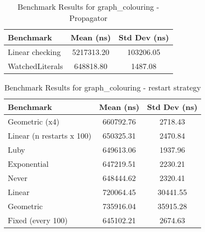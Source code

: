 \begin{table}[h]
    \centering
    \caption{Benchmark Results for graph\_colouring - Propagator}
    \begin{tabular}{|l|c|c|}
        \hline
        Benchmark & Mean (ns) & Std Dev (ns) \\
        \hline
        Linear checking & 5217313.20 & 103206.05 \\
        WatchedLiterals & 648818.80 & 1487.08 \\
        \hline
    \end{tabular}
\label{tab:bench-graph_colouring---Propagator}
\end{table}


\begin{table}[h]
    \centering
    \caption{Benchmark Results for graph\_colouring - restart strategy}
    \begin{tabular}{|l|c|c|}
        \hline
        Benchmark & Mean (ns) & Std Dev (ns) \\
        \hline
        Geometric (x4) & 660792.76 & 2718.43 \\
        Linear (n restarts x 100) & 650325.31 & 2470.84 \\
        Luby & 649613.06 & 1937.96 \\
        Exponential & 647219.51 & 2230.21 \\
        Never & 648444.62 & 2320.41 \\
        Linear & 720064.45 & 30441.55 \\
        Geometric & 735916.04 & 35915.28 \\
        Fixed (every 100) & 645102.21 & 2674.63 \\
        \hline
    \end{tabular}
\label{tab:bench-graph_colouring---restart-strategy}
\end{table}

